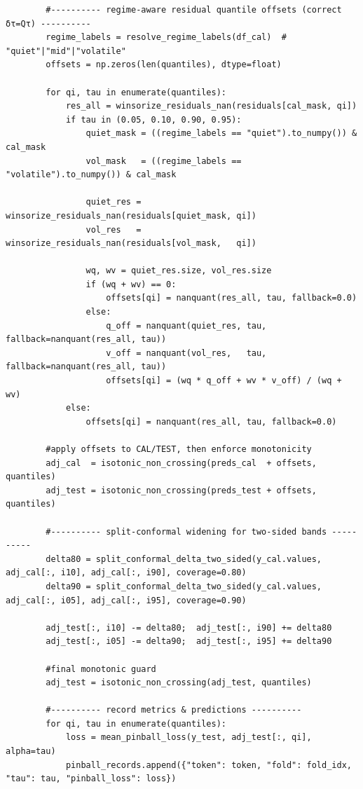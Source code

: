 \documentclass[
  a4paper,
  DIV=11,
  numbers=noendperiod]{scrreprt}
\begin{document}
\begin{verbatim}
        #---------- regime-aware residual quantile offsets (correct δτ=Qτ) ----------
        regime_labels = resolve_regime_labels(df_cal)  # "quiet"|"mid"|"volatile"
        offsets = np.zeros(len(quantiles), dtype=float)

        for qi, tau in enumerate(quantiles):
            res_all = winsorize_residuals_nan(residuals[cal_mask, qi])
            if tau in (0.05, 0.10, 0.90, 0.95):
                quiet_mask = ((regime_labels == "quiet").to_numpy()) & cal_mask
                vol_mask   = ((regime_labels == "volatile").to_numpy()) & cal_mask

                quiet_res = winsorize_residuals_nan(residuals[quiet_mask, qi])
                vol_res   = winsorize_residuals_nan(residuals[vol_mask,   qi])

                wq, wv = quiet_res.size, vol_res.size
                if (wq + wv) == 0:
                    offsets[qi] = nanquant(res_all, tau, fallback=0.0)
                else:
                    q_off = nanquant(quiet_res, tau, fallback=nanquant(res_all, tau))
                    v_off = nanquant(vol_res,   tau, fallback=nanquant(res_all, tau))
                    offsets[qi] = (wq * q_off + wv * v_off) / (wq + wv)
            else:
                offsets[qi] = nanquant(res_all, tau, fallback=0.0)

        #apply offsets to CAL/TEST, then enforce monotonicity
        adj_cal  = isotonic_non_crossing(preds_cal  + offsets, quantiles)
        adj_test = isotonic_non_crossing(preds_test + offsets, quantiles)

        #---------- split-conformal widening for two-sided bands ----------
        delta80 = split_conformal_delta_two_sided(y_cal.values, adj_cal[:, i10], adj_cal[:, i90], coverage=0.80)
        delta90 = split_conformal_delta_two_sided(y_cal.values, adj_cal[:, i05], adj_cal[:, i95], coverage=0.90)

        adj_test[:, i10] -= delta80;  adj_test[:, i90] += delta80
        adj_test[:, i05] -= delta90;  adj_test[:, i95] += delta90

        #final monotonic guard
        adj_test = isotonic_non_crossing(adj_test, quantiles)

        #---------- record metrics & predictions ----------
        for qi, tau in enumerate(quantiles):
            loss = mean_pinball_loss(y_test, adj_test[:, qi], alpha=tau)
            pinball_records.append({"token": token, "fold": fold_idx, "tau": tau, "pinball_loss": loss})


\end{verbatim}
\end{document}

